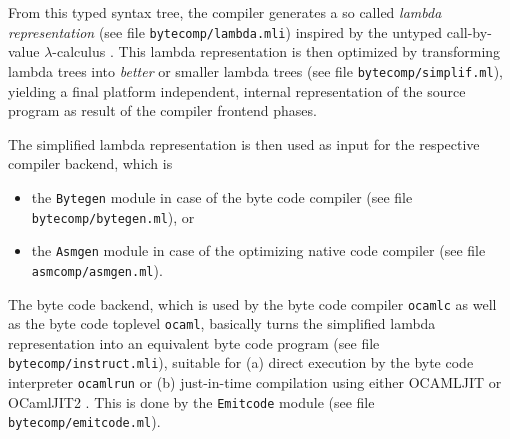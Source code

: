 \documentclass[10pt,a4paper,draft,twocolumn]{article}
\begin{document}
From this typed syntax tree, the compiler generates a so called \emph{lambda representation} (see file
\texttt{bytecomp/lambda.mli}) inspired by the untyped call-by-value $\lambda$-calculus
\cite{Appel98ml,Jones87,Michaelson89}. This lambda representation is then optimized by
transforming lambda trees into \emph{better} or smaller lambda trees (see file
\texttt{bytecomp/simplif.ml}), yielding a final platform independent, internal
representation of the source program as result of the compiler frontend phases.

The simplified lambda representation is then used as input for the respective compiler
backend, which is
\begin{itemize}
\item the \texttt{Bytegen} module in case of the byte code compiler
  (see file \texttt{bytecomp/bytegen.ml}), or
\item the \texttt{Asmgen} module in case of the optimizing native code compiler
  (see file \texttt{asmcomp/asmgen.ml}).
\end{itemize}

The byte code backend, which is used by the byte code compiler \texttt{ocamlc} as well as
the byte code toplevel \texttt{ocaml}, basically turns the simplified lambda representation
into an equivalent byte code program (see file \texttt{bytecomp/instruct.mli}), suitable for
(a) direct execution by the byte code interpreter \texttt{ocamlrun} or (b) just-in-time
compilation using either OCAMLJIT \cite{Starynkevitch04} or OCamlJIT2
\cite{Meurer10jit,Meurer10ocamljit,Meurer11ocamljit2}.
This is done by the \texttt{Emitcode} module (see file \texttt{bytecomp/emitcode.ml}).
\end{document}
